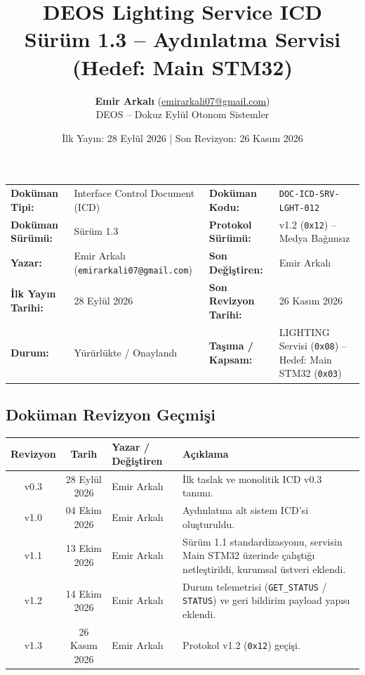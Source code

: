 \documentclass[a4paper,10pt]{article}
\title{\textbf{DEOS Lighting Service ICD}\\
\large Sürüm 1.3 -- Aydınlatma Servisi (Hedef: Main STM32)}
\author{\textbf{Emir Arkalı} (\href{mailto:emirarkali07@gmail.com}{emirarkali07@gmail.com})\\DEOS -- Dokuz Eylül Otonom Sistemler}
\date{İlk Yayın: 28 Eylül 2026 \quad | \quad Son Revizyon: 26 Kasım 2026}
\newcommand{\hex}[1]{\texttt{0x#1}}
\newcommand{\code}[1]{\texttt{#1}}
\begin{document}
\maketitle

\begin{center}
\small
\begin{tabularx}{\textwidth}{ll lX}
\toprule
\textbf{Doküman Tipi:} & Interface Control Document (ICD) & \textbf{Doküman Kodu:} & \code{DOC-ICD-SRV-LGHT-012} \\
\textbf{Doküman Sürümü:} & Sürüm 1.3 & \textbf{Protokol Sürümü:} & v1.2 (\hex{12}) -- Medya Bağımsız \\
\textbf{Yazar:} & Emir Arkalı (\texttt{emirarkali07@gmail.com}) & \textbf{Son Değiştiren:} & Emir Arkalı \\
\textbf{İlk Yayın Tarihi:} & 28 Eylül 2026 & \textbf{Son Revizyon Tarihi:} & 26 Kasım 2026 \\
\textbf{Durum:} & Yürürlükte / Onaylandı & \textbf{Taşıma / Kapsam:} & LIGHTING Servisi (\hex{08}) -- Hedef: Main STM32 (\hex{03}) \\
\bottomrule
\end{tabularx}
\end{center}

\subsection*{Doküman Revizyon Geçmişi}
\begin{center}
\small
\begin{tabularx}{\textwidth}{c c l X}
\toprule
\textbf{Revizyon} & \textbf{Tarih} & \textbf{Yazar / Değiştiren} & \textbf{Açıklama} \\
\midrule
v0.3 & 28 Eylül 2026 & Emir Arkalı & İlk taslak ve monolitik ICD v0.3 tanımı. \\
v1.0 & 04 Ekim 2026 & Emir Arkalı & Aydınlatma alt sistem ICD'si oluşturuldu. \\
v1.1 & 13 Ekim 2026 & Emir Arkalı & Sürüm 1.1 standardizasyonu, servisin Main STM32 üzerinde çalıştığı netleştirildi, kurumsal üstveri eklendi. \\
v1.2 & 14 Ekim 2026 & Emir Arkalı & Durum telemetrisi (\code{GET\_STATUS} / \code{STATUS}) ve geri bildirim payload yapısı eklendi. \\
v1.3 & 26 Kasım 2026 & Emir Arkalı & Protokol v1.2 (\hex{12}) geçişi. \\
\bottomrule
\end{tabularx}
\end{center}
\vspace{0.8em}
\end{document}

